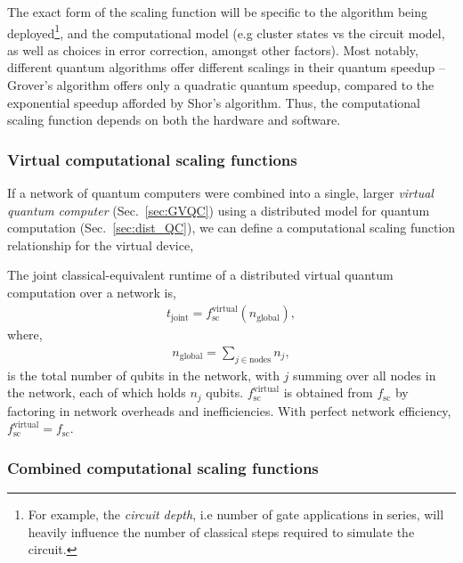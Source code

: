 The exact form of the scaling function will be specific to the algorithm being deployed\footnote{For example, the \textit{circuit depth}, i.e number of gate applications in series, will heavily influence the number of classical steps required to simulate the circuit.}, and the computational model (e.g cluster states vs the circuit model, as well as choices in error correction, amongst other factors). Most notably, different quantum algorithms offer different scalings in their quantum speedup -- Grover's algorithm offers only a quadratic quantum speedup, compared to the exponential speedup afforded by Shor's algorithm. Thus, the computational scaling function depends on both the hardware and software.

%
%

\subsubsection{Virtual computational scaling functions}

If a network of quantum computers were combined into a single, larger \textit{virtual quantum computer} (Sec.~\ref{sec:GVQC}) using a distributed model for quantum computation (Sec.~\ref{sec:dist_QC}), we can define a computational scaling function relationship for the virtual device,

\begin{definition}
The joint classical-equivalent runtime of a distributed virtual quantum computation over a network is,
\begin{align}
t_\text{joint} = f_\text{sc}^\text{virtual}(n_\text{global}),
\end{align}
where,
\begin{align}
n_\text{global} = \sum_{j\in\text{nodes}} n_j,
\end{align}
is the total number of qubits in the network, with $j$ summing over all nodes in the network, each of which holds $n_j$ qubits. $f_\text{sc}^\text{virtual}$ is obtained from $f_\text{sc}$ by factoring in network overheads and inefficiencies. With perfect network efficiency, \mbox{$f_\text{sc}^\text{virtual}=f_\text{sc}$}.
\end{definition}

%
%

\subsubsection{Combined computational scaling functions}

